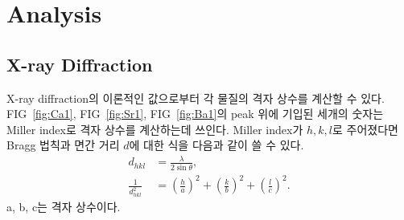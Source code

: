 \documentclass[aps,reprint,superscriptaddress,10pt]{revtex4-2}
\begin{document}
\newpage
\section{Analysis}
\subsection{X-ray Diffraction}
X-ray diffraction의 이론적인 값으로부터 각 물질의 격자 상수를 계산할 수 있다.
FIG~\ref{fig:Ca1}, FIG~\ref{fig:Sr1}, FIG~\ref{fig:Ba1}의 peak 위에 기입된
세개의 숫자는 Miller index로 격자 상수를 계산하는데 쓰인다. Miller index가 
$h,k,l$로 주어졌다면 Bragg 법칙과 면간 거리 $d$에 대한 식을 다음과 같이 쓸 수 있다.
\begin{align}
  \label{eq:1} d_{hkl} &= \frac{\lambda}{2\sin\theta},\,\,\,  \\
  \label{eq:2} \frac{1}{d_{hkl}^2} &=\left(\frac{h}{a}\right)^2
  +\left(\frac{k}{b}\right)^2+\left(\frac{l}{c}\right)^2.
\end{align}
a, b, c는 격자 상수이다.
\newpage
\end{document}
